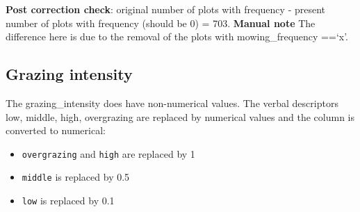 \documentclass[table]{article}
\newenvironment{Shaded}{\begin{snugshade}}{\end{snugshade}}
\newcommand{\KeywordTok}[1]{\textcolor[rgb]{0.13,0.29,0.53}{\textbf{#1}}}
\newcommand{\DataTypeTok}[1]{\textcolor[rgb]{0.13,0.29,0.53}{#1}}
\newcommand{\DecValTok}[1]{\textcolor[rgb]{0.00,0.00,0.81}{#1}}
\newcommand{\FloatTok}[1]{\textcolor[rgb]{0.00,0.00,0.81}{#1}}
\newcommand{\StringTok}[1]{\textcolor[rgb]{0.31,0.60,0.02}{#1}}
\newcommand{\OperatorTok}[1]{\textcolor[rgb]{0.81,0.36,0.00}{\textbf{#1}}}
\newcommand{\NormalTok}[1]{#1}
\providecommand{\tightlist}{%
  \setlength{\itemsep}{0pt}\setlength{\parskip}{0pt}}
\begin{document}
\begin{Shaded}
\end{Shaded}

\textbf{Post correction check}: original number of plots with frequency
- present number of plots with frequency (should be 0) = 703.
\textbf{Manual note} The difference here is due to the removal of the
plots with mowing\_frequency ==`x'.

\subsection{Grazing intensity}\label{grazing-intensity}

The grazing\_intensity does have non-numerical values. The verbal
descriptors low, middle, high, overgrazing are replaced by numerical
values and the column is converted to numerical:

\begin{itemize}
\tightlist
\item
  \texttt{overgrazing} and \texttt{high} are replaced by 1
\item
  \texttt{middle} is replaced by 0.5
\item
  \texttt{low} is replaced by 0.1
\end{itemize}

\begin{Shaded}
\end{Shaded}
\end{document}
